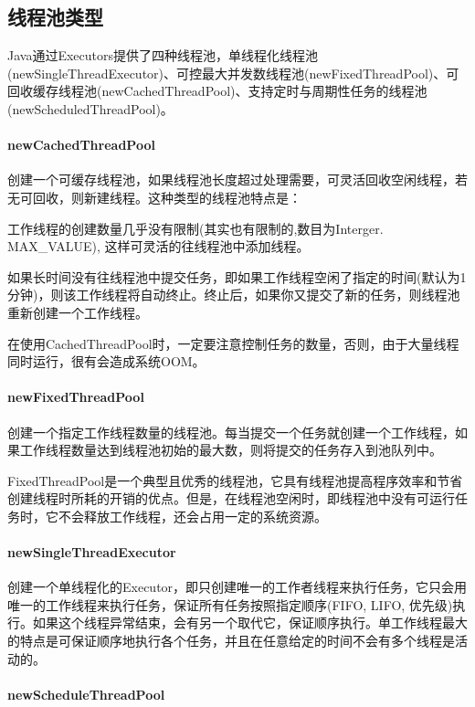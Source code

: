 \documentclass[../../../interview-questions.tex]{subfiles}
\begin{document}
\subsection{线程池类型}

Java通过Executors提供了四种线程池，单线程化线程池(newSingleThreadExecutor)、可控最大并发数线程池(newFixedThreadPool)、可回收缓存线程池(newCachedThreadPool)、支持定时与周期性任务的线程池(newScheduledThreadPool)。

\paragraph{newCachedThreadPool}

创建一个可缓存线程池，如果线程池长度超过处理需要，可灵活回收空闲线程，若无可回收，则新建线程。这种类型的线程池特点是：

工作线程的创建数量几乎没有限制(其实也有限制的,数目为Interger. MAX\_VALUE), 这样可灵活的往线程池中添加线程。

如果长时间没有往线程池中提交任务，即如果工作线程空闲了指定的时间(默认为1分钟)，则该工作线程将自动终止。终止后，如果你又提交了新的任务，则线程池重新创建一个工作线程。

在使用CachedThreadPool时，一定要注意控制任务的数量，否则，由于大量线程同时运行，很有会造成系统OOM。

\paragraph{newFixedThreadPool}

创建一个指定工作线程数量的线程池。每当提交一个任务就创建一个工作线程，如果工作线程数量达到线程池初始的最大数，则将提交的任务存入到池队列中。

FixedThreadPool是一个典型且优秀的线程池，它具有线程池提高程序效率和节省创建线程时所耗的开销的优点。但是，在线程池空闲时，即线程池中没有可运行任务时，它不会释放工作线程，还会占用一定的系统资源。

\paragraph{newSingleThreadExecutor}

创建一个单线程化的Executor，即只创建唯一的工作者线程来执行任务，它只会用唯一的工作线程来执行任务，保证所有任务按照指定顺序(FIFO, LIFO, 优先级)执行。如果这个线程异常结束，会有另一个取代它，保证顺序执行。单工作线程最大的特点是可保证顺序地执行各个任务，并且在任意给定的时间不会有多个线程是活动的。

\paragraph{newScheduleThreadPool}
\end{document}
